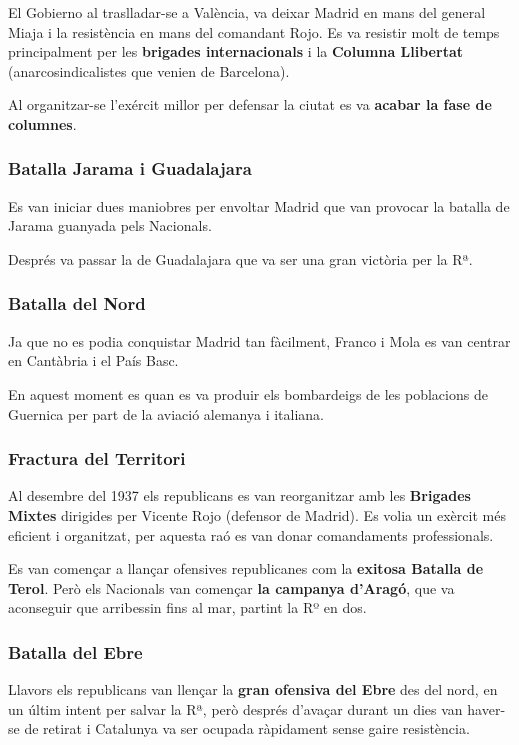 \documentclass[arial,a4paper,print]{article}
\begin{document}
El Gobierno al traslladar-se a València, va deixar Madrid en mans del general Miaja i la resistència en mans del comandant Rojo. Es va resistir molt de temps principalment per les \textbf{brigades internacionals} i la \textbf{Columna Llibertat} (anarcosindicalistes que venien de Barcelona).  

Al organitzar-se l'exércit millor per defensar la ciutat es va \textbf{acabar la fase de columnes}. 

\subsubsection{Batalla Jarama i Guadalajara}
Es van iniciar dues maniobres per envoltar Madrid que van provocar la batalla de Jarama guanyada pels Nacionals. 

Després va passar la de Guadalajara que va ser una gran victòria per la Rª. 

\subsubsection{Batalla del Nord}
Ja que no es podia conquistar Madrid tan fàcilment, Franco i Mola es van centrar en Cantàbria i el País Basc. 

En aquest moment es quan es va produir els bombardeigs de les poblacions de Guernica per part de la aviació alemanya i italiana. 

\subsubsection{Fractura del Territori}
Al desembre del 1937 els republicans es van reorganitzar amb les \textbf{Brigades Mixtes} dirigides per Vicente Rojo (defensor de Madrid). Es volia un exèrcit més eficient i organitzat, per aquesta raó es van donar comandaments professionals. 

Es van començar a llançar ofensives republicanes com la \textbf{exitosa Batalla de Terol}. Però els Nacionals van començar \textbf{la campanya d'Aragó}, que va aconseguir que arribessin fins al mar, partint la Rº en dos.  

\subsubsection{Batalla del Ebre}
Llavors els republicans van llençar la \textbf{gran ofensiva del Ebre} des del nord, en un últim intent per salvar la Rª, però després d'avaçar durant un dies van haver-se de retirat i Catalunya va ser ocupada ràpidament sense gaire resistència. 
\end{document}
